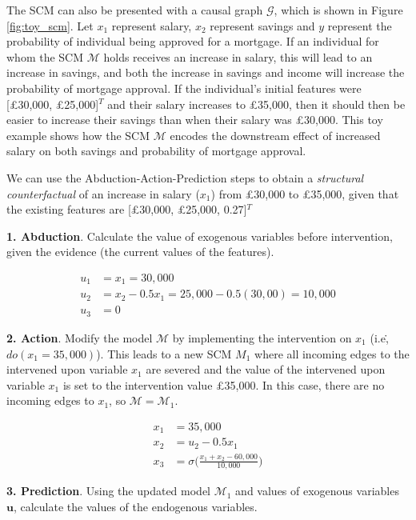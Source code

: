 The SCM can also be presented with a causal graph $\mathcal{G}$, which is shown in Figure \ref{fig:toy_scm}. Let $x_1$ represent salary, $x_2$ represent savings and $y$ represent the probability of individual being approved for a mortgage. If an individual for whom the SCM $\mathcal{M}$ holds receives an increase in salary, this will lead to an increase in savings, and both the increase in savings and income will increase the probability of mortgage approval. If the individual's initial features were [£30,000, £25,000]$^T$ and their salary increases to £35,000, then it should then be easier to increase their savings than when their salary was £30,000. This toy example shows how the SCM $\mathcal{M}$ encodes the downstream effect of increased salary on both savings and probability of mortgage approval.

We can use the Abduction-Action-Prediction steps \citep{pearl2016causal} to obtain a \textit{structural counterfactual} of an increase in salary ($x_1$) from £30,000 to £35,000, given that the existing features are [£30,000, £25,000, 0.27]$^T$

\textbf{1. Abduction}. Calculate the value of exogenous variables before intervention, given the evidence (the current values of the features).

\begin{align}
	u_1 & = x_1 = 30,000 \\ \nonumber
	u_2 & = x_2 - 0.5x_1 = 25,000 - 0.5(30,00) = 10,000 \\ \nonumber
	u_3 & = 0
\end{align}

\textbf{2. Action}. Modify the model $\mathcal{M}$ by implementing the intervention on $x_1$ (i.e\., $do(x_1=35,000)$). This leads to a new SCM $M_1$ where all incoming edges to the intervened upon variable $x_1$ are severed and the value of the intervened upon variable $x_1$ is set to the intervention value £35,000. In this case, there are no incoming edges to $x_1$, so $\mathcal{M} = \mathcal{M}_1$.

\begin{align}
	x_1 & = 35,000 \\ \nonumber
	x_2 & = u_2 - 0.5x_1 \\ \nonumber
	x_3 & = \sigma \bigg(\frac{x_1 + x_2 - 60,000}{10,000} \bigg) \nonumber
\end{align}

\textbf{3. Prediction}. Using the updated model $\mathcal{M}_1$ and values of exogenous variables $\mathbf{u}$, calculate the values of the endogenous variables.

